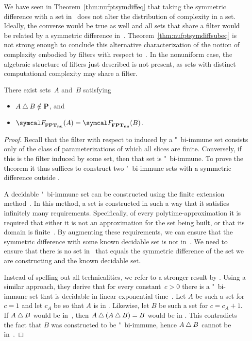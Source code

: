 We have seen in Theorem~\ref{thm:nufptsymdiffeq} that taking the symmetric difference with a set in~ does not alter the distribution of complexity in a set.
Ideally, the converse would be true as well and all sets that share a filter would be related by a symmetric difference in~.
Theorem~\ref{thm:nufptsymdiffsubeq} is not strong enough to conclude this alternative characterization of the notion of complexity embodied by filters with respect to~.
In the nonuniform case, the algebraic structure of filters just described is not present, as sets with distinct computational complexity may share a filter.
\begin{theorem}
\label{thm:nufptsymdiff}%
  There exist sets~$A$ and~$B$ satisfying
  \begin{itemize}
  \item $A \bigtriangleup B \notin \textnormal{\textbf{P}}$, and
  \item $\calF_\clnu{FPT}(A) = \calF_\clnu{FPT}(B)$.
  \end{itemize}
\end{theorem}
\begin{proof}
  Recall that the filter with respect to  induced by a "~bi-immune set consists only of the class of parameterizations of which all slices are finite.
  Conversely, if this is the filter induced by some set, then that set is "~bi-immune.
  To prove the theorem it thus suffices to construct two "~bi-immune sets with a symmetric difference outside .

  A decidable "~bi-immune set can be constructed using the finite extension method~\parencite{downey2010algorithmic}.
  In this method, a set is constructed in such a way that it satisfies infinitely many requirements.
  Specifically, of every polytime-approximation it is required that either it is not an approximation for the set being built, or that its domain is finite~\parencite{balcazar1990structural}.
  By augmenting these requirements, we can ensure that the symmetric difference with some known decidable set is not in~.
  We need to ensure that there is no set in~ that equals the symmetric difference of the set we are constructing and the known decidable set.

  Instead of spelling out all technicalities, we refer to a stronger result by \textcite{geske1991note}.
  Using a similar approach, they derive that for every constant~$c > 0$ there is a "~bi-immune set that is decidable in linear exponential time~\parencite[see also][]{mayordomo1994almost}.
  Let $A$ be such a set for $c = 1$ and let $c_A$ be so that $A$ is in .
  Likewise, let $B$ be such a set for $c = c_A + 1$.
  If $A \bigtriangleup B$ would be in~, then $A \bigtriangleup (A \bigtriangleup B) = B$ would be in .
  This contradicts the fact that $B$ was constructed to be "~bi-immune, hence $A \bigtriangleup B$ cannot be in~.
\end{proof}

